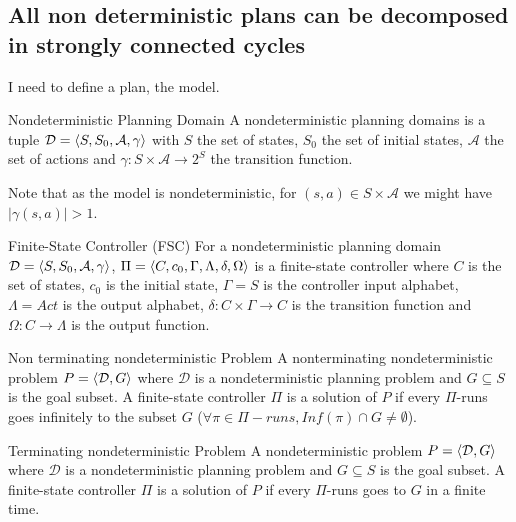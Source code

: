 \subsection{All non deterministic plans can be decomposed in strongly connected cycles}

\newcommand{\planningdomain}{\ensuremath{ \tuple{\langle S, S_0, \mathcal{A}, \gamma \rangle} }}

\newcommand{\controller}{\ensuremath{\tuple{ \langle C, c_0, \Gamma, \Lambda, \delta, \Omega \rangle}}}

\newcommand{\planningproblem}{\ensuremath{\tuple{ \langle \mathcal{D}, G \rangle}}}
I need to define a plan, the model.

\begin{nameddef}{Nondeterministic Planning Domain}
A nondeterministic planning domains is a tuple 
$\mathcal{D} = \planningdomain$
with
$S$ the set of states,
$S_0$ the set of initial states,
$\mathcal{A}$ the set of actions and
$\gamma : S \times \mathcal{A} \rightarrow 2^S$ the transition function.
\end{nameddef}

Note that as the model is nondeterministic, for $(s,a) \in S \times \mathcal{A}$ we might have $|\gamma(s,a)|>1$.

\begin{nameddef}{Finite-State Controller (FSC)}
For a nondeterministic planning domain
$\mathcal{D} = \planningdomain$,
$\Pi = \controller$ is a finite-state controller where
$C$ is the set of states,
$c_0$ is the initial state,
$\Gamma = S$ is the controller input alphabet,
$\Lambda = Act$ is the output alphabet,
$\delta: C \times \Gamma \rightarrow C$ is the transition function and 
$\Omega: C \rightarrow \Lambda$ is the output function.
\end{nameddef}

\begin{nameddef}{Non terminating nondeterministic Problem}
A nonterminating nondeterministic problem $P = \planningproblem$ where $\mathcal{D}$ is a nondeterministic planning problem and $G \subseteq S$ is the goal subset. A finite-state controller $\Pi$ is a solution of $P$ if every $\Pi$-runs goes infinitely to the subset $G$ ($\forall \pi \in \Pi-runs, Inf(\pi) \cap G \neq \emptyset$).
\end{nameddef}

\begin{nameddef}{Terminating nondeterministic Problem}
A nondeterministic problem $P = \planningproblem$ where $\mathcal{D}$ is a nondeterministic planning problem and $G \subseteq S$ is the goal subset. A finite-state controller $\Pi$ is a solution of $P$ if every $\Pi$-runs goes to $G$ in a finite time.
\end{nameddef}

